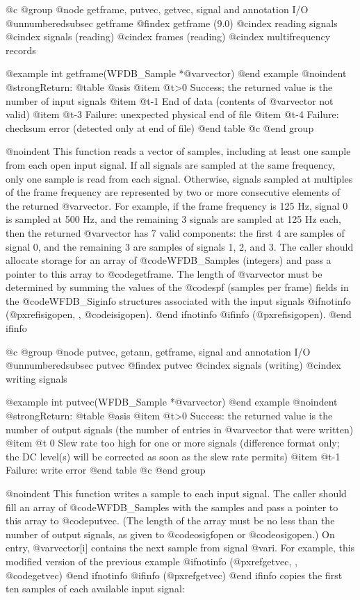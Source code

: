 {{{{{{{{@c @group
@node    getframe, putvec, getvec, signal and annotation I/O
@unnumberedsubsec getframe
@findex getframe (9.0)
@cindex reading signals
@cindex signals (reading)
@cindex frames (reading)
@cindex multifrequency records

@example
int getframe(WFDB_Sample *@var{vector})
@end example
@noindent
@strong{Return:}
@table @asis
@item @t{>0}
Success;  the returned value is the number of input signals
@item @t{-1}
End of data (contents of @var{vector} not valid)
@item @t{-3}
Failure: unexpected physical end of file
@item @t{-4}
Failure: checksum error (detected only at end of file)
@end table
@c @end group

@noindent
This function reads a vector of samples, including at least one sample from
each open input signal.  If all signals are sampled at the same frequency, only
one sample is read from each signal.  Otherwise, signals sampled at multiples
of the frame frequency are represented by two or more consecutive elements of
the returned @var{vector}.  For example, if the frame frequency is 125 Hz,
signal 0 is sampled at 500 Hz, and the remaining 3 signals are sampled at 125
Hz each, then the returned @var{vector} has 7 valid components: the first 4 are
samples of signal 0, and the remaining 3 are samples of signals 1, 2, and 3.
The caller should allocate storage for an array of @code{WFDB_Sample}s
(integers) and pass a pointer to this array to @code{getframe}.  The length of
@var{vector} must be determined by summing the values of the @code{spf}
(samples per frame) fields in the @code{WFDB_Siginfo} structures associated
with the input signals
@ifnotinfo
(@pxref{isigopen, , @code{isigopen}}).
@end ifnotinfo
@ifinfo
(@pxref{isigopen}).
@end ifinfo

@c @group
@node     putvec, getann, getframe, signal and annotation I/O
@unnumberedsubsec putvec
@findex putvec
@cindex signals (writing)
@cindex writing signals

@example
int putvec(WFDB_Sample *@var{vector})
@end example
@noindent
@strong{Return:}
@table @asis
@item @t{>0}
Success: the returned value is the number of output signals (the number
of entries in @var{vector} that were written)
@item @t{ 0}
Slew rate too high for one or more signals (difference format only; the
DC level(s) will be corrected as soon as the slew rate permits)
@item @t{-1}
Failure: write error
@end table
@c @end group

@noindent
This function writes a sample to each input signal.  The caller should fill an
array of @code{WFDB_Sample}s with the samples and pass a pointer to this array
to @code{putvec}.  (The length of the array must be no less than the number of
output signals, as given to @code{osigfopen} or @code{osigopen}.)  On entry,
@var{vector[i]} contains the next sample from signal @var{i}.  For example,
this modified version of the previous example
@ifnotinfo
(@pxref{getvec, , @code{getvec}})
@end ifnotinfo
@ifinfo
(@pxref{getvec})
@end ifinfo
copies the first ten samples of each available input signal:

}}}}}}}}
